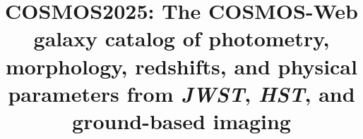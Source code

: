 \documentclass[longauth]{aa}
\begin{document}



\newcommand{\mum}{\,\si{\micron}\xspace}
\newcommand{\vect}[1]{\boldsymbol{#1}}
\newcommand{\zphot}{$z_{\rm phot}$}
\newcommand{\zspec}{$z_{\rm spec}$}
\newcommand{\sigmaLogMs}{\sigma_{\text{Log}M_*}}
\newcommand{\mstar}{M_{\star}}
\def\oiii{[\ion{O}{III}]}
\newcommand{\SEpp}{\texttt{SE++}}
\newcommand{\hotcold}{\texttt{hot+cold}}
\newcommand{\psfex}{\texttt{PSFEx}\xspace}
\newcommand{\lephare}{\texttt{LePHARE}\xspace}
\newcommand{\cigale}{\texttt{CIGALE}\xspace}
\newcommand{\warnfl}{\texttt{warn\_flag}\xspace}

\newcommand{\hst}{\textit{HST}}
\newcommand{\JWST}{\textit{JWST}}
\newcommand{\HSC}{HSC}
\newcommand{\UVISTA}{UltraVISTA}
\newcommand{\SCUBA}{SCUBA-2}
\newcommand{\CFHT}{CFHT}
\newcommand{\DES}{DES}
\newcommand{\Subaru}{\textit{Subaru}}
\newcommand{\AGEL}{AGEL}
\newcommand{\ALMA}{ALMA}
\newcommand{\NIRCAM}{NIRCam}
\newcommand{\MIRI}{MIRI}
\newcommand{\SPIRE}{SPIRE}
\newcommand{\SPITZER}{\textit{Spitzer}}
\newcommand{\PACS}{PACS}



\title{COSMOS2025: The COSMOS-Web galaxy catalog of photometry, morphology, redshifts, and physical parameters from \JWST, \hst,   and ground-based imaging}
\subtitle{}  
\end{document}
